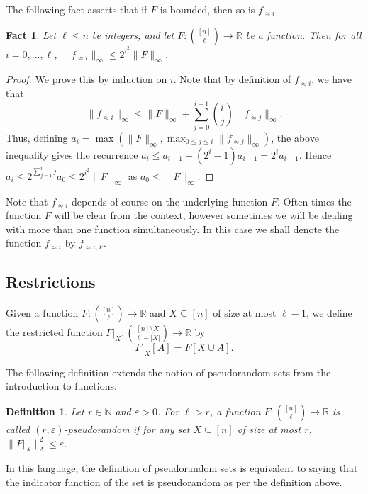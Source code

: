 \documentclass[11pt]{article}
\newtheorem{fact}[theorem]{Fact}
\newtheorem{definition}[theorem]{Definition}
\newcommand\card[1]{\left| {#1} \right|}
\newcommand\norm[1]{\| #1 \|}
\newcommand\eps{\varepsilon}
\renewcommand\leq{\leqslant}
\newcommand\approxlvlfn[2]{{#1}_{\approx{#2}}}
\begin{document}
The following fact asserts that if $F$ is bounded, then so is $\approxlvlfn{f}{i}$.
\begin{fact}\label{fact:bdd}
Let $\ell\leq n$ be integers, and let
$F\colon {[n]\choose \ell}\to\mathbb{R}$ be a function.
Then for all $i=0,...,\ell$, $\norm{\approxlvlfn{f}{i}}_{\infty} \leq 2^{i^2}\norm{F}_{\infty}$.
\end{fact}
\begin{proof}
  We prove this by induction on $i$. Note that by definition of $\approxlvlfn{f}{i}$, we have that
  \[
  \norm{\approxlvlfn{f}{i}}_{\infty}
  \leq \norm{F}_{\infty} + \sum\limits_{j=0}^{i-1}\binom{i}{j}\norm{\approxlvlfn{f}{j}}_{\infty}.
  \]
  Thus, defining $a_i = \max(\norm{F}_{\infty}, \max_{0\leq j\leq i} \norm{\approxlvlfn{f}{j}}_{\infty})$, the above inequality gives %
  the recurrence $a_i\leq a_{i-1} + (2^{i}-1) a_{i-1} = 2^{i} a_{i-1}$. Hence $a_i\leq 2^{\sum\limits_{j=1}^{i} j} a_0 \leq 2^{i^2}\norm{F}_{\infty}$
  as $a_0 \leq \norm{F}_{\infty}$.
\end{proof}



Note that $\approxlvlfn{f}{i}$ depends of course on the underlying function $F$.
Often times the function $F$
will be clear from the context, however sometimes we will be dealing with more than one function
simultaneously. In this case we shall denote the function $\approxlvlfn{f}{i}$ by $\approxlvlfn{f}{i, F}$.


\subsection{Restrictions}
Given a function $F\colon {[n] \choose \ell}\to \mathbb{R}$ and $X\subseteq [n]$ of size at most
$\ell-1$, we define the restricted function $F|_X \colon {[n]\setminus X\choose \ell-\card{X}} \to\mathbb{R}$ by
\[
F|_X[A] = F[X\cup A].
\]

The following definition extends the notion of pseudorandom sets from the introduction to functions.
\begin{definition}
  Let $r\in\mathbb{N}$ and $\eps>0$. For $\ell>r$, a function $F\colon {[n] \choose \ell} \to\mathbb{R}$ is called \emph{$(r,\eps)$-pseudorandom} %
  if for any set $X\subseteq[n]$ of size at most $r$, $\norm{F|_X}_2^2 \leq \eps$.
\end{definition}
In this language, the definition of pseudorandom sets is equivalent to saying that the indicator function of the set is pseudorandom as per
the definition above.
\end{document}
